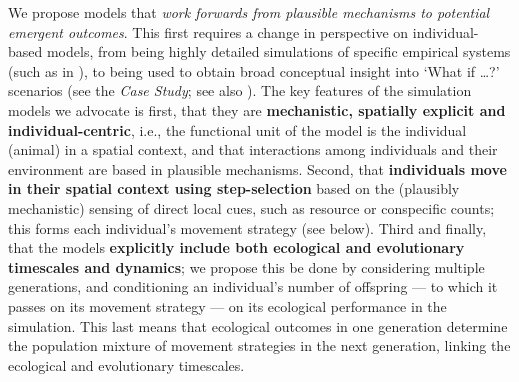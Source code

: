 We propose models that \textit{work forwards from plausible mechanisms to potential emergent outcomes}.
This first requires a change in perspective on individual-based models, from being highly detailed simulations of specific empirical systems (such as in \cite{diaz2021,stillman2010,bocedi2014}), to being used to obtain broad conceptual insight into `What if \ldots?' scenarios (see the \emph{Case Study}; see also \cite{white2018,gupte2021a,gupte2022c,netz2021,getz2015,getz2016}).
The key features of the simulation models we advocate is first, that they are \textbf{mechanistic, spatially explicit and individual-centric}, i.e., the functional unit of the model is the individual (animal) in a spatial context, and that interactions among individuals and their environment are based in plausible mechanisms.
Second, that \textbf{individuals move in their spatial context using step-selection} based on the (plausibly mechanistic) sensing of direct local cues, such as resource or conspecific counts; this forms each individual's movement strategy (see below).
Third and finally, that the models \textbf{explicitly include both ecological and evolutionary timescales and dynamics}; we propose this be done by considering multiple generations, and conditioning an individual's number of offspring --- to which it passes on its movement strategy --- on its ecological performance in the simulation.
This last means that ecological outcomes in one generation determine the population mixture of movement strategies in the next generation, linking the ecological and evolutionary timescales.

